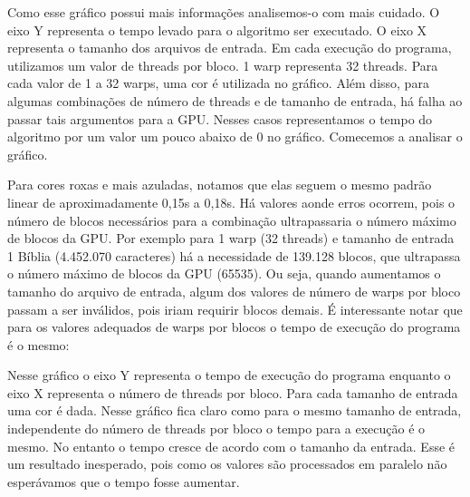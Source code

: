 \documentclass[12pt]{article}
\begin{document}
Como esse gráfico possui mais informações analisemos-o com mais cuidado.
O eixo Y representa o tempo levado para o algoritmo ser executado.
O eixo X representa o tamanho dos arquivos de entrada. Em cada execução
do programa, utilizamos um valor de threads por bloco. 1 warp 
representa 32 threads. Para cada valor de 1 a 32 warps, uma cor é
utilizada no gráfico. Além disso, para algumas combinações de número de
threads e de tamanho de entrada, há falha ao passar tais argumentos
para a GPU. Nesses casos representamos o tempo do algoritmo por um valor
um pouco abaixo de 0 no gráfico. Comecemos a analisar o gráfico.

Para cores roxas e mais azuladas, notamos que elas seguem o mesmo padrão
linear de aproximadamente 0,15s a 0,18s. Há valores aonde erros
ocorrem, pois o número de blocos necessários para a combinação
ultrapassaria o número máximo de blocos da GPU. Por exemplo para 1 warp
(32 threads) e tamanho de entrada 1 Bíblia (4.452.070 caracteres) há a
necessidade de 139.128 blocos, que ultrapassa o número máximo de blocos
da GPU (65535). Ou seja, quando aumentamos o tamanho do arquivo de
entrada, algum dos valores de número de warps por bloco passam a ser
inválidos, pois iriam requirir blocos demais. É interessante notar que
para os valores adequados de warps por blocos o tempo de execução do
programa é o mesmo:

\begin{figure}[H]
\end{figure}

Nesse gráfico o eixo Y representa o tempo de execução do programa
enquanto o eixo X representa o número de threads por bloco. Para cada
tamanho de entrada uma cor é dada. Nesse gráfico fica claro como para o
mesmo tamanho de entrada, independente do número de threads por bloco o
tempo para a execução é o mesmo. No entanto o tempo cresce de acordo com
o tamanho da entrada. Esse é um resultado inesperado, pois como os 
valores são processados em paralelo não esperávamos que o tempo fosse
aumentar.
\end{document}
